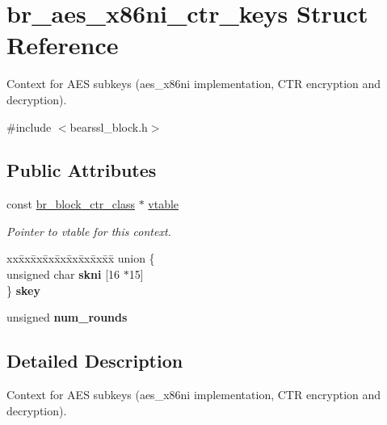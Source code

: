 \hypertarget{structbr__aes__x86ni__ctr__keys}{}\section{br\+\_\+aes\+\_\+x86ni\+\_\+ctr\+\_\+keys Struct Reference}
\label{structbr__aes__x86ni__ctr__keys}


Context for A\+ES subkeys ({\ttfamily aes\+\_\+x86ni} implementation, C\+TR encryption and decryption).  




{\ttfamily \#include $<$bearssl\+\_\+block.\+h$>$}

\subsection*{Public Attributes}
\begin{DoxyCompactItemize}
\item 
\mbox{\label{structbr__aes__x86ni__ctr__keys_abfd1aa4d5d363932acc554dd958aabde}} 
const \hyperlink{bearssl__block_8h_a8934ac58af503220bfb6e6cbc2cfb209}{br\+\_\+block\+\_\+ctr\+\_\+class} $\ast$ \hyperlink{structbr__aes__x86ni__ctr__keys_abfd1aa4d5d363932acc554dd958aabde}{vtable}
\begin{DoxyCompactList}\small\item\em Pointer to vtable for this context. \end{DoxyCompactList}\item 
\mbox{\label{structbr__aes__x86ni__ctr__keys_a5ba98b209e5703d17930a985913873fc}} 
\begin{tabbing}
xx\=xx\=xx\=xx\=xx\=xx\=xx\=xx\=xx\=\kill
union \{\\
\>unsigned char {\bfseries skni} \mbox{[}16 $\ast$15\mbox{]}\\
\} {\bfseries skey}\\

\end{tabbing}\item 
\mbox{\label{structbr__aes__x86ni__ctr__keys_a224e846115d5c1e73d2110ff25f6bda9}} 
unsigned {\bfseries num\+\_\+rounds}
\end{DoxyCompactItemize}


\subsection{Detailed Description}
Context for A\+ES subkeys ({\ttfamily aes\+\_\+x86ni} implementation, C\+TR encryption and decryption). 

